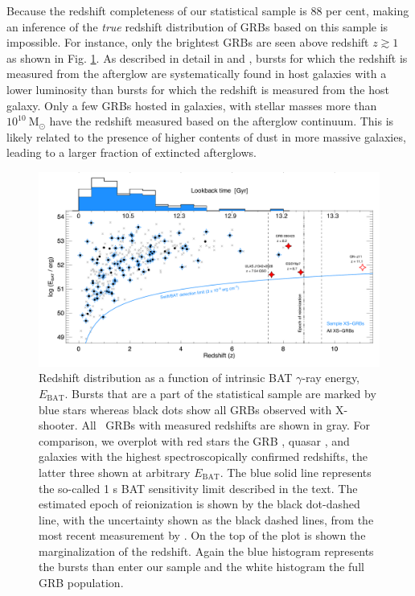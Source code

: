 \documentclass[longauth]{aa}    %
\begin{document}
Because the redshift completeness of our statistical sample is 88 per cent,
making an inference of the \textit{true} redshift distribution of GRBs based on
this sample is impossible. %
For instance, only the brightest GRBs are seen above redshift $z \gtrsim 1$ as
shown in Fig. \ref{fig:z}. As described in detail in \citet{Hjorth2012} and
\citet{Perley2016b}, bursts for which the redshift is measured from the
afterglow are systematically found in host galaxies with a lower luminosity
than bursts for which the redshift is measured from the host galaxy. Only a few
GRBs hosted in galaxies, with stellar masses more than
$10^{10}~\mathrm{M}_\odot$ have the redshift measured based on the afterglow
continuum. This is likely related to the presence of higher contents of dust in
more massive galaxies, leading to a larger fraction of extincted afterglows.



\begin{figure}[!ht]
	\centering \includegraphics[width=\linewidth]{figures/XSGRB_redshift.pdf}
\caption{Redshift distribution as a function of intrinsic BAT $\gamma$-ray
	energy, $E_{\mathrm{BAT}}$. Bursts that are a part of the statistical sample
	are marked by blue stars whereas black dots show all GRBs observed with
	X-shooter. All \swift~GRBs with measured redshifts are shown in gray. For
	comparison, we overplot with red stars the GRB \citep{Tanvir2009b,
		Salvaterra2009a}, quasar \citep{Banados2017}, and galaxies \citep{Zitrin2015,
		Oesch2016} with the highest spectroscopically confirmed redshifts, the latter
	three shown at arbitrary $E_{\mathrm{BAT}}$. The blue solid line represents the
	so-called 1 s BAT sensitivity limit described in the text. The estimated epoch
	of reionization is shown by the black dot-dashed line, with the uncertainty
	shown as the black dashed lines, from the most recent measurement by
	\citet{Planck2015}. On the top of the plot is shown the marginalization of the
	redshift. Again the blue histogram represents the bursts than enter our sample
	and the white histogram the full GRB population. } \label{fig:z}
\end{figure}
\end{document}
